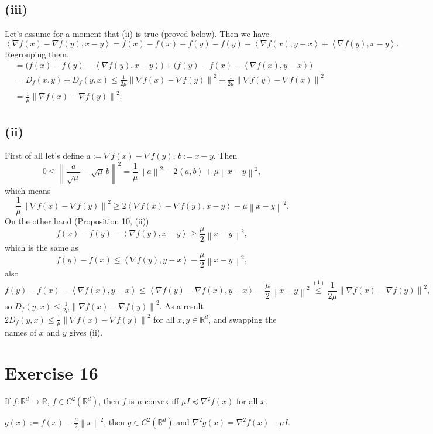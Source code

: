 \documentclass[11pt,a4paper]{article}
\newcommand{\R}{\mathbb{R}}
\newcommand{\norm}[1]{\left\| #1 \right\|}
\newcommand{\ip}[2]{\left\langle #1, #2 \right\rangle}
\begin{document}
\subsection*{(iii)}
Let's assume for a moment that (ii) is true (proved below). Then we have
\[
  \ip{\nabla f(x) - \nabla f(y)}{x-y}
  = f(x) - f(x) + f(y) - f(y) + \ip{\nabla f(x)}{y-x} + \ip{\nabla f(y)}{x-y}.
\]
Regrouping them,
\begin{align*}
  &= \bigl(f(x) - f(y) - \ip{\nabla f(y)}{x-y}\bigr) + \bigl(f(y) - f(x) - \ip{\nabla f(x)}{y-x}\bigr) \\
  &= D_f(x,y) + D_f(y,x)
  \le \frac{1}{2\mu}\norm{\nabla f(x) - \nabla f(y)}^2 + \frac{1}{2\mu}\norm{\nabla f(y) - \nabla f(x)}^2 \\
  &= \frac{1}{\mu}\norm{\nabla f(x) - \nabla f(y)}^2 .
\end{align*}

\subsection*{(ii)}
First of all let's define $a := \nabla f(x) - \nabla f(y)$, $b := x - y$. Then
\[
  0 \le \norm{\frac{a}{\sqrt{\mu}} - \sqrt{\mu}\, b}^2
  = \frac{1}{\mu}\norm{a}^2 - 2\ip{a}{b} + \mu\norm{x-y}^2 ,
\]
which means
\[
  \frac{1}{\mu}\norm{\nabla f(x) - \nabla f(y)}^2
  \ge 2\ip{\nabla f(x) - \nabla f(y)}{x-y} - \mu\norm{x-y}^2 . \tag{1}
\]
On the other hand (Proposition 10, (ii))
\[
  f(x) - f(y) - \ip{\nabla f(y)}{x-y} \ge \frac{\mu}{2}\norm{x-y}^2 ,
\]
which is the same as
\[
  f(y) - f(x) \le \ip{\nabla f(y)}{y-x} - \frac{\mu}{2}\norm{x-y}^2 ,
\]
also
\[
  f(y) - f(x) - \ip{\nabla f(x)}{y-x}
  \le \ip{\nabla f(y) - \nabla f(x)}{y-x} - \frac{\mu}{2}\norm{x-y}^2
  \overset{(1)}{\le} \frac{1}{2\mu}\norm{\nabla f(x) - \nabla f(y)}^2 ,
\]
so $D_f(y,x) \le \frac{1}{2\mu}\norm{\nabla f(x) - \nabla f(y)}^2$. As a result
$2D_f(y,x) \le \frac{1}{\mu}\norm{\nabla f(x) - \nabla f(y)}^2$ for all $x, y \in \R^d$, and
swapping the names of $x$ and $y$ gives (ii).

\section*{Exercise 16}

If $f : \R^d \to \R$, $f \in C^2(\R^d)$, then $f$ is $\mu$-convex iff
$\mu I \preceq \nabla^2 f(x)$ for all $x$.

$g(x) := f(x) - \frac{\mu}{2}\norm{x}^2$, then $g \in C^2(\R^d)$ and
$\nabla^2 g(x) = \nabla^2 f(x) - \mu I$.
\end{document}
